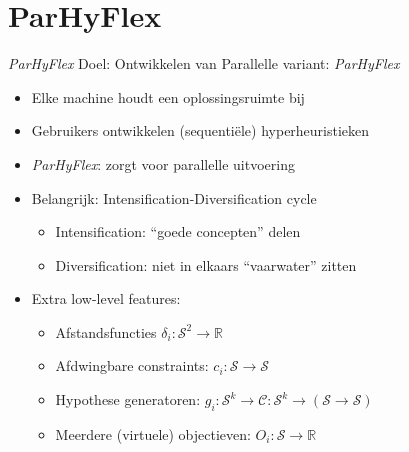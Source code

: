 \documentclass{beamer}
\newcommand{\sol}{\mathcal{S}}
\newcommand{\constr}{\mathcal{C}}
\newcommand{\RR}{\mathbb{R}}
\begin{document}
\section{ParHyFlex}
\begin{frame}{\emph{ParHyFlex}}
Doel: Ontwikkelen van Parallelle variant: \emph{ParHyFlex}
\begin{itemize}[<+->]
 \item Elke machine houdt een oplossingsruimte bij
 \item Gebruikers ontwikkelen (sequenti\"ele) hyperheuristieken
 \item \emph{ParHyFlex}: zorgt voor parallelle uitvoering
 \item Belangrijk: Intensification-Diversification cycle
 \begin{itemize}[<+->]
  \item Intensification: ``goede concepten'' delen
  \item Diversification: niet in elkaars ``vaarwater'' zitten
 \end{itemize}
 \item Extra low-level features:
 \begin{itemize}[<+->]
  \item Afstandsfuncties $\delta_i:\sol^2\rightarrow\RR$
  \item Afdwingbare constraints: $c_i:\sol\rightarrow\sol$
  \item Hypothese generatoren: $g_i:\sol^k\rightarrow\constr:\sol^k\rightarrow\left(\sol\rightarrow\sol\right)$
  \item Meerdere (virtuele) objectieven: $O_i:\sol\rightarrow\RR$
 \end{itemize}
\end{itemize}
\end{frame}
\end{document}
